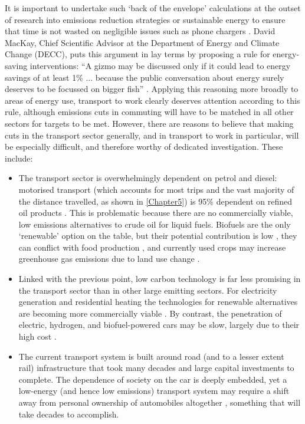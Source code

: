 It is important to undertake such `back of the
envelope' calculations at the outset of research into emissions reduction
strategies or sustainable energy to ensure that time is not wasted on negligible
issues such as phone chargers \citep{MacKay2009}. David MacKay, Chief Scientific
Advisor at the Department of Energy and Climate Change (DECC), puts this
argument in lay terms by proposing a rule for
energy-saving interventions: ``A gizmo may be discussed only if it could lead to
energy savings of at least 1\% ... because the public conversation about energy
surely deserves to be
focussed on bigger fish'' \citep{MacKay2009-energyplates}. Applying this
reasoning more broadly to areas of energy use, transport to work clearly
deserves attention according to
this rule, although emissions cuts in commuting will have to be matched in all
other sectors for targets to be met. However, there are reasons to believe that
making cuts in the transport sector generally, and in transport to work in
particular, will be especially difficult, and therefore worthy of dedicated
investigation. These include:
\begin{itemize}
\item The transport sector is overwhelmingly dependent on petrol and diesel:
motorised transport (which accounts for most trips and the vast majority of the
distance travelled, as shown in \cref{Chapter5}) is 95\% %
dependent on refined oil products \citep{Woodcock2007}. This is problematic
because there are no commercially viable, low emissions alternatives to crude
oil for liquid fuels. Biofuels are the only `renewable' option on the table,
but their potential contribution is low \citep{Patzek2006,Michel2012}, they
can conflict with
food production \citep{Pimentel2009}, and currently used crops may increase
greenhouse gas emissions due to land use change \citep{Fargione2008}.
\item Linked with the previous point, low carbon technology is far less
promising in the transport sector than in other large emitting sectors.
For electricity generation and residential heating the technologies
for renewable alternatives are becoming more commercially viable \citep{Chu2012}.
By contrast,
the penetration of electric, hydrogen, and biofuel-powered cars may be slow,
largely due to their high cost \citep{Proost2011,AdamVaughan2011}.
\item The current transport system is built around road (and to a lesser extent
rail) infrastructure that took many decades and large capital investments to
complete. The dependence of society on the car is deeply embedded, yet a
low-energy (and hence low emissions) transport system may require a shift away
from personal ownership of automobiles altogether
\citep{MacKay2009,Moriarty2010}, something that will take decades to accomplish.
\end{itemize}
